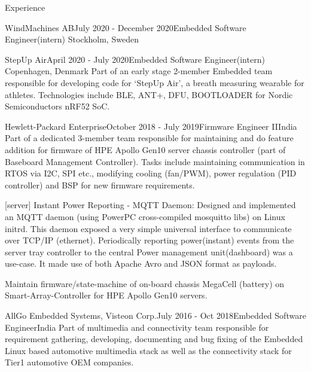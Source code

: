 \documentclass[
	11pt, %
]{resume} %
\begin{document}
\begin{rSection}{Experience}
\begin{rSubsection}{WindMachines AB}{July 2020 - December 2020}{Embedded Software Engineer(intern)}{ Stockholm, Sweden}
	\end{rSubsection}
 

	\begin{rSubsection}{StepUp Air}{April 2020 - July 2020}{Embedded Software Engineer(intern)}{ Copenhagen, Denmark}
            Part of an early stage 2-member Embedded team responsible for developing code for ‘StepUp Air’, a breath measuring wearable for athletes. Technologies include BLE, ANT+, DFU, BOOTLOADER for Nordic Semiconductors nRF52 SoC.

	\end{rSubsection}
 

	\begin{rSubsection}{Hewlett-Packard Enterprise}{October 2018 - July 2019}{Firmware Engineer II}{India}
            Part of a dedicated 3-member team responsible for maintaining and do feature addition for firmware of HPE Apollo Gen10 server chassis controller (part of Baseboard Management Controller). Tasks include maintaining communication in RTOS via I2C, SPI etc., modifying cooling (fan/PWM), power regulation (PID controller) and BSP for new firmware requirements.
            \break \break

            [server] Instant Power Reporting - MQTT Daemon: Designed and implemented an MQTT daemon (using PowerPC cross-compiled mosquitto libs) on Linux initrd. This daemon exposed a very simple universal interface to communicate over TCP/IP (ethernet). Periodically reporting power(instant) events from the server tray controller to the central Power management unit(dashboard) was a use-case. It made use of both Apache Avro and JSON format as payloads.
            \break \break
            
            Maintain firmware/state-machine of on-board chassis MegaCell (battery) on Smart-Array-Controller for HPE
Apollo Gen10 servers.


	\end{rSubsection}

	\begin{rSubsection}{AllGo Embedded Systems, Visteon Corp.}{July 2016 - Oct 2018}{Embedded Software Engineer}{India}
            Part of multimedia and connectivity team responsible for requirement gathering, developing, documenting and bug fixing of the Embedded Linux based automotive multimedia stack as well as the connectivity stack for Tier1 automotive OEM companies.
            \bigskip\break


\end{rSubsection}
\end{rSection}
\end{document}

